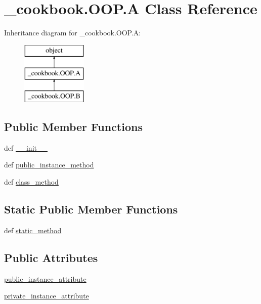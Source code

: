 \hypertarget{class__cookbook_1_1OOP_1_1A}{\section{\-\_\-cookbook.\-O\-O\-P.\-A Class Reference}
\label{class__cookbook_1_1OOP_1_1A}
}
Inheritance diagram for \-\_\-cookbook.\-O\-O\-P.\-A\-:\begin{figure}[H]
\begin{center}
\leavevmode
\includegraphics[height=3.000000cm]{d3/d8c/class__cookbook_1_1OOP_1_1A}
\end{center}
\end{figure}
\subsection*{Public Member Functions}
\begin{DoxyCompactItemize}
\item 
def \hyperlink{class__cookbook_1_1OOP_1_1A_aed1bb10487eebd0cba829be5e9572fde}{\-\_\-\-\_\-init\-\_\-\-\_\-}
\item 
def \hyperlink{class__cookbook_1_1OOP_1_1A_a0d6fe46ab76e7c05b4678bc56711b8be}{public\-\_\-instance\-\_\-method}
\item 
def \hyperlink{class__cookbook_1_1OOP_1_1A_a53147a5118b4d97348912e8ed2a5e45a}{class\-\_\-method}
\end{DoxyCompactItemize}
\subsection*{Static Public Member Functions}
\begin{DoxyCompactItemize}
\item 
def \hyperlink{class__cookbook_1_1OOP_1_1A_a6a8b4be6f2fe4addd97735dc47bc3ced}{static\-\_\-method}
\end{DoxyCompactItemize}
\subsection*{Public Attributes}
\begin{DoxyCompactItemize}
\item 
\hyperlink{class__cookbook_1_1OOP_1_1A_a3ff5d9c90ff2e8a6cb22e6e031085b87}{public\-\_\-instance\-\_\-attribute}
\item 
\hyperlink{class__cookbook_1_1OOP_1_1A_ab13df620204437ce904e7d8d582dab9c}{private\-\_\-instance\-\_\-attribute}
\end{DoxyCompactItemize}
